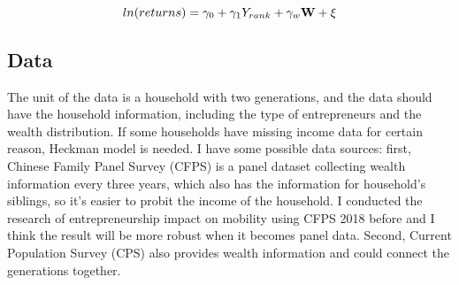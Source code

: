 \documentclass[a4paper,12pt]{article}
\begin{document}
\begin{equation}
ln(returns)=\gamma_0+\gamma_1 Y_{rank}+\gamma_w \textbf{W}+\xi \\
\end{equation}

\subsection{Data}

The unit of the data is a household with two generations, and the data should have the household information, including the type of entrepreneurs and the wealth distribution. If some households have missing income data for certain reason, Heckman model is needed. I have some possible data sources: first, Chinese Family Panel Survey (CFPS) is a panel dataset collecting wealth information every three years, which also has the information for household's siblings, so it's easier to probit the income of the household. I conducted the research of entrepreneurship impact on mobility using CFPS 2018 before and I think the result will be more robust when it becomes panel data. Second, Current Population Survey (CPS)  also provides wealth information and could connect the generations together. 
\end{document}
